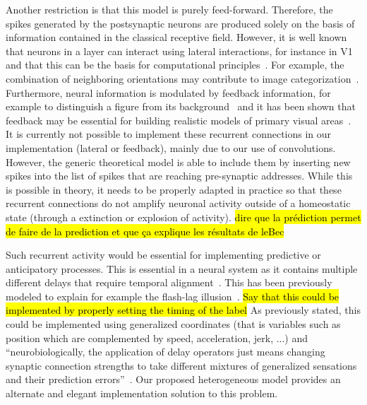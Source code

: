 \documentclass[default]{sn-jnl}%
\theoremstyle{thmstyleone}%
\theoremstyle{thmstyletwo}%
\theoremstyle{thmstylethree}%
\newcommand{\note}[1]{{\sethlcolor{yellow}\hl{#1}}}
\begin{document}
Another restriction is that this model is purely feed-forward. Therefore, the spikes generated by the postsynaptic neurons are produced solely on the basis of information contained in the classical receptive field. However, it is well known that neurons in a layer can interact using lateral interactions, for instance in V1 and that this can be the basis for computational principles~\citep{chavane_revisiting_2022}. For example, the combination of neighboring orientations may contribute to image categorization~\citep{perrinet_edge_2015}. Furthermore, neural information is modulated by feedback information, for example to distinguish a figure from its background~\citep{roelfsema_early_2016} and it has been shown that feedback may be essential for building realistic models of primary visual areas~\citep{boutin_sparse_2020, boutin_effect_2020, boutin_pooling_2022}. It is currently not possible to implement these recurrent connections in our implementation (lateral or feedback), mainly due to our use of convolutions. However, the generic theoretical model is able to include them by inserting new spikes into the list of spikes that are reaching pre-synaptic addresses. While this is possible in theory, it needs to be properly adapted in practice so that these recurrent connections do not amplify neuronal activity outside of a homeostatic state (through a extinction or explosion of activity).  
\note{ dire que la prédiction permet de faire de la prediction et que ça explique les résultats de leBec}~\citep{perrinet_motion-based_2012}


Such recurrent activity would be essential for implementing predictive or anticipatory processes. This is essential in a neural system as it contains multiple different delays that require temporal alignment~\citep{hogendoorn_predictive_2019}. This has been previously modeled to explain for example the flash-lag illusion~\citep{khoei_flash-lag_2017}. \note{Say that this could be implemented by properly setting the timing of the label} As previously stated, this could be implemented using generalized coordinates (that is variables such as position which are complemented by speed, acceleration, jerk, ...) and ``neurobiologically, the application of delay operators just means changing synaptic connection strengths to take different mixtures of generalized sensations and their prediction errors''~\citep{perrinet_active_2014}. Our proposed heterogeneous model provides an alternate and elegant implementation solution to this problem.
%
\end{document}
